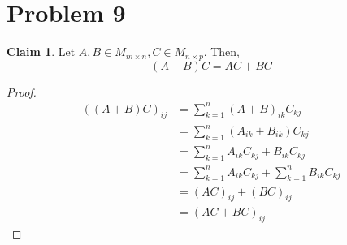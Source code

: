 \documentclass[12pt,letterpaper]{article}
\theoremstyle{definition}
\newtheorem*{claim}{Claim}
\begin{document}
\section*{Problem 9}

\begin{claim}
  Let $A, B \in M_{m \times n}, C \in M_{n \times p}$. Then,
  \[
    (A + B)C = AC + BC
  \]
\end{claim}

\begin{proof}
  \begin{align*}
    ((A + B)C)_{ij} &= \sum_{k=1}^n(A + B)_{ik}C_{kj} \\
                    &= \sum_{k=1}^n(A_{ik} + B_{ik})C_{kj} \\
                    &= \sum_{k=1}^nA_{ik}C_{kj} + B_{ik}C_{kj} \\
                    &= \sum_{k=1}^nA_{ik}C_{kj} + \sum_{k=1}^nB_{ik}C_{kj} \\
                    &= (AC)_{ij} + (BC)_{ij} \\
                    &= (AC + BC)_{ij}
  \end{align*}
\end{proof}
\end{document}
